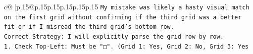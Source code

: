 \documentclass{article}
\begin{document}
{\begin{supertabular}{c@{$\;$}|p{.15\linewidth}@{}p{.15\linewidth}p{.15\linewidth}p{.15\linewidth}p{.15\linewidth}p{.15\linewidth}}
{{{\texttt{My mistake was likely a hasty visual match on the first grid without confirming if the third grid was a better fit or if I misread the third grid's bottom row.} \\
\texttt{Correct Strategy: I will explicitly parse the grid row by row.} \\
\texttt{1. Check Top{-}Left: Must be "□". (Grid 1: Yes, Grid 2: No, Grid 3: Yes} \\
            }
        }
    }
     \\ \\

\end{supertabular}
}
\end{document}
